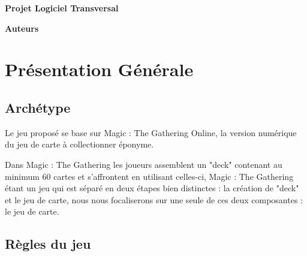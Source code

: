 \documentclass[a4paper,12pt]{article}
\begin{document}
\thispagestyle{empty}

\begin{titlepage}

\vspace*{2cm}

\begin{center}\textbf{\Huge Projet Logiciel Transversal}\end{center}{\Large \par}

\begin{center}\textbf{\large Auteurs}\end{center}{\large \par}

\vspace{2cm}


\clearpage

{\small
\tableofcontents
}

\end{titlepage}

\clearpage

\section{Présentation Générale}

\subsection{Archétype}
Le jeu proposé se base sur Magic : The Gathering Online, la version numérique du jeu de carte à collectionner éponyme.

Dans Magic : The Gathering les joueurs assemblent un "deck" contenant au minimum 60 cartes et s'affrontent en utilisant celles-ci, Magic : The Gathering étant un jeu qui est séparé en deux étapes bien distinctes : la création de "deck" et le jeu de carte, nous nous focaliserons sur une seule de ces deux composantes : le jeu de carte.


\subsection{Règles du jeu}
\end{document}
